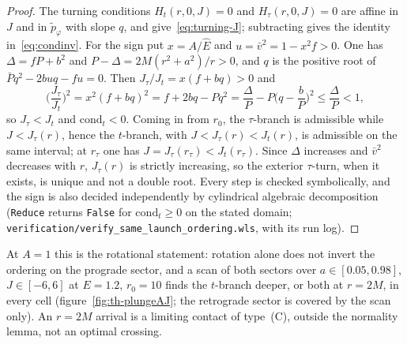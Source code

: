 \documentclass[12pt]{iopart}
\theoremstyle{plain}
\theoremstyle{definition}
\theoremstyle{remark}
\newcommand{\Ehat}{\hat E}
\begin{document}
\begin{proof}
The turning conditions $H_t(r,0,J)=0$ and $H_\tau(r,0,J)=0$ are affine in $J$ and in
$\tilde p_\varphi$ with slope $q$, and give~\eqref{eq:turning-J}; subtracting gives the
identity in~\eqref{eq:condinv}. For the sign put $x=A/\Ehat$ and $u=\bar v^2=1-x^2f>0$. One has
$\Delta=fP+b^2$ and $P-\Delta=2M(r^2+a^2)/r>0$, and $q$ is the positive root of
$\bar Pq^2-2buq-fu=0$. Then $J_\tau/J_t=x(f+bq)>0$ and
\[
    \Big(\frac{J_\tau}{J_t}\Big)^2=x^2(f+bq)^2=f+2bq-Pq^2
    =\frac{\Delta}{P}-P\Big(q-\frac bP\Big)^2\le\frac{\Delta}{P}<1 ,
\]
so $J_\tau<J_t$ and $\mathrm{cond}_t<0$. Coming in from $r_0$, the $\tau$-branch is admissible
while $J<J_\tau(r)$, hence the $t$-branch, with $J<J_\tau(r)<J_t(r)$, is admissible on the same
interval; at $r_\tau$ one has $J=J_\tau(r_\tau)<J_t(r_\tau)$. Since $\Delta$ increases and $\bar v^2$
decreases with $r$, $J_\tau(r)$ is strictly increasing, so the exterior $\tau$-turn, when it
exists, is unique and not a double root. Every step is checked symbolically, and the sign is
also decided independently by cylindrical algebraic decomposition (\texttt{Reduce} returns
\texttt{False} for $\mathrm{cond}_t\ge0$ on the stated domain;
\texttt{verification/verify\_same\_launch\_ordering.wls}, with its run log).
\end{proof}

At $A=1$ this is the rotational statement: rotation alone does not invert the ordering on
the prograde sector, and a scan of both sectors over $a\in[0.05,0.98]$, $J\in[-6,6]$ at
$E=1.2$, $r_0=10$ finds the $t$-branch deeper, or both at $r=2M$, in every cell
(figure~\ref{fig:th-plungeAJ}; the retrograde sector is covered by the scan only). An
$r=2M$ arrival is a limiting contact of type~(C), outside the normality lemma, not an
optimal crossing.
\end{document}
